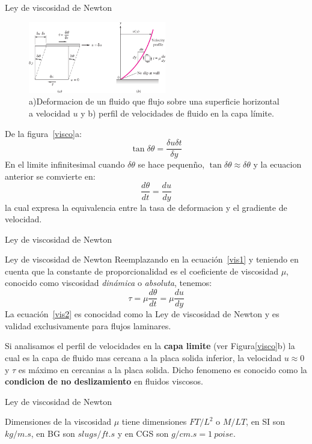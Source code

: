 \documentclass [xcolor=svgnames, t] {beamer}
\begin{document}
\begin{frame}{Ley de viscosidad de Newton}
\small
\vspace{-0.4cm}
\begin{figure}[h]
\centering
\includegraphics[width=6cm]{visco}
\caption{a)Deformacion de un fluido que flujo sobre una superficie horizontal a velocidad $u$ y  b) perfil de velocidades de fluido en la capa l\'imite.}
\end{figure}
\vspace{-0.4cm}
De la figura~\ref{visco}a:
$$
\tan \delta \theta = \frac{\delta u \delta t}{\delta y}
$$
En el limite infinitesimal cuando $\delta \theta$ se hace pequen\~no, $\tan \delta \theta \approx \delta \theta$ y la ecuacion anterior se comvierte en:
$$
\frac{d\theta}{dt}=\frac{du}{dy}
$$
la cual expresa la equivalencia entre la tasa de deformacion y el gradiente de velocidad.

\end{frame}

\begin{frame}{Ley de viscosidad de Newton}
\begin{block}{Ley de viscosidad de Newton}
Reemplazando en la ecuaci\'on~\ref{vis1} y teniendo en cuenta que la constante de proporcionalidad es el coeficiente de viscosidad $\mu$, conocido como viscosidad \emph{din\'amica} o \emph{absoluta}, tenemos:
\begin{equation}
\tau = \mu \frac{d \theta}{d t} = \mu \frac{d u}{d y}
\label{vis2}
\end{equation}
La ecuaci\'on~\ref{vis2} es conocidad como la Ley de viscosidad de Newton y es validad exclusivamente para flujos laminares.
\end{block}
Si analisamos el perfil de velocidades en la \textbf{capa limite} (ver Figura\ref{visco}b) la cual es la capa de fluido mas cercana a la placa solida inferior, la velocidad $u \approx 0$ y $\tau$ es m\'aximo en cercanias a la placa solida. Dicho fenomeno es conocido como la \textbf{condicion de no deslizamiento} en fluidos viscosos. 

\end{frame}

\begin{frame}{Ley de viscosidad de Newton}
\begin{block}{Dimensiones de la viscosidad}
$\mu$ tiene dimensiones ${FT/L^2}$ o ${M/LT}$, en SI son $kg/m.s$, en BG son $slugs/ft.s$ y en CGS son $g/cm.s = 1\ poise$. 
\end{block}
\end{frame}
\end{document}
